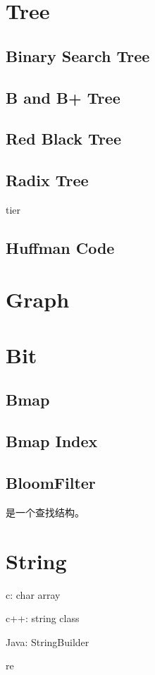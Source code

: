 \section{Tree}

\subsection{Binary Search Tree}

\subsection{B and B+ Tree}

\subsection{Red Black Tree}

\subsection{Radix Tree}

tier

\subsection{Huffman Code}

\section{Graph}

\section{Bit}

\subsection{Bmap}

\subsection{Bmap Index}

\subsection{BloomFilter}

是一个查找结构。

\section{String}

\begin{enumbox}
\item c: char array
\item c++: string class
\item Java: StringBuilder
\item re
\end{enumbox}
